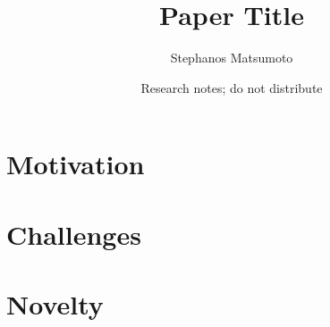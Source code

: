 \documentclass[10pt]{article}
\title{Paper Title}
\author{Stephanos Matsumoto}
\date{Research notes; do not distribute}
\begin{document}
\maketitle

\section{Motivation}

\section{Challenges}

\section{Novelty}




\end{document}
